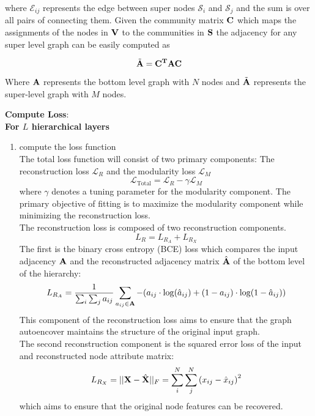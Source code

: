 \documentclass[a4paper,12pt]{article}
\begin{document}
\begin{itemize}
\begin{enumerate}
{\begin{enumerate}
{					where $\mathcal{E}_{ij}$ represents the edge between super nodes $\mathcal{S}_i$ and $\mathcal{S}_j$ and the sum is over all pairs of connecting them. Given the community matrix $\bf C$ which maps the assignments of the nodes in $\bf V$ to the communities in $\mathcal{\bf S}$ the adjacency for any super level graph can be easily computed as 
						
					\[ \tilde{\bf A} = {\bf C^T}{\bf A}{\bf C} \] 
						
					Where $\bf A$ represents the bottom level graph with $N$ nodes and $\tilde{\bf A}$ represents the super-level graph with $M$ nodes.
				}
					
			\end{enumerate}
			
			
			\item[2.2.2]{\textbf{Compute Loss}: \\
				\textbf{For $L$ hierarchical layers}
			\begin{enumerate}
				\item[]{compute the loss function \\
					
					The total loss function will consist of two primary components: The reconstruction loss $\mathcal{L}_R$ and the modularity loss $\mathcal{L}_M$
					\[\mathcal{L}_{\text{Total}} = \mathcal{L}_R - \gamma\mathcal{L}_M \]
					where $\gamma$ denotes a tuning parameter for the modularity component. The primary objective of fitting is to maximize the modularity component while minimizing the reconstruction loss. \\
					
					The reconstruction loss is composed of two reconstruction components.
					\[L_R = L_{R_A}+L_{R_X}\]
					The first is the binary cross entropy (BCE) loss which compares the input adjacency $\bf A$ and the reconstructed adjacency matrix  $\hat{\bf A}$ of the bottom level of the hierarchy: 
					\[L_{R_A} = \frac{1}{\sum_i\sum_j a_{ij}} \sum_{a_{ij}\in {\bf A}} -(a_{ij} \cdot\log(\hat{a}_{ij})+(1 - a_{ij})\cdot\log(1 - \hat{a}_{ij})) \]
					This component of the reconstruction loss aims to ensure that the graph autoencover maintains the structure of the original input graph. \\
					
					The second reconstruction component is the squared error loss of the input and reconstructed node attribute matrix:
					\[L_{R_X} = ||{\bf X} - \hat{\bf X}||_F = \sum_i^N \sum_j^N \left(x_{ij} - \hat{x}_{ij}\right)^2 \]
					which aims to ensure that the original node features can be recovered. \\
					
}
\end{enumerate}}}
\end{enumerate}
\end{itemize}
\end{document}
